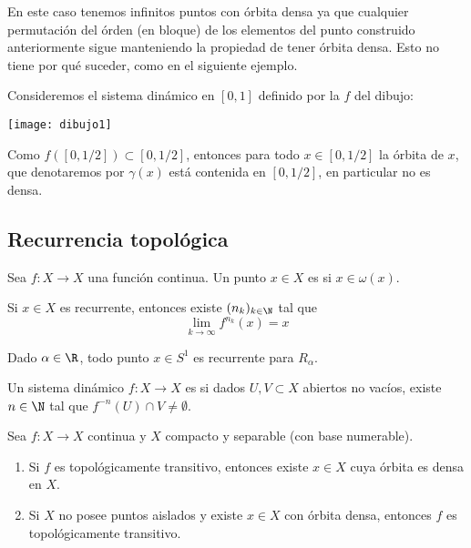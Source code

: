 \documentclass[	docname= Sistemas\ Din\'amicos,
				finished=1,
				semester=1,
				year=2017,
				professor=Godofredo\ Iommi,
				sigla=MAT2565]{apunte}
\begin{document}
En este caso tenemos infinitos puntos con órbita densa ya que cualquier permutación del órden (en bloque) de los elementos del punto construido anteriormente sigue manteniendo la propiedad de tener órbita densa. Esto no tiene por qué suceder, como en el siguiente ejemplo.

\begin{ex} Consideremos el sistema dinámico en $[0,1]$ definido por la $f$ del dibujo:
	\begin{center}
		\texttt{[image: dibujo1]}
	\end{center}
	
Como $f([0,1/2]) \subset [0,1/2]$, entonces para todo $x \in [0,1/2]$ la órbita de $x$, que denotaremos por $\gamma(x)$ está contenida en $[0,1/2]$, en particular no es densa.
\end{ex}

\subsection{Recurrencia topológica}

\begin{defn} Sea $f: X \to X$ una función continua. Un punto $x \in X$ es  si $x \in \omega(x)$.
\end{defn}

\begin{obsd} Si $x \in X$ es recurrente, entonces existe $(n_{k})_{k \in \N}$ tal que
	$$\lim_{k \to \infty} f^{n_{k}}(x) = x$$
\end{obsd}

\begin{ex} Dado $\alpha \in \R$, todo punto $x \in S^{1}$ es recurrente para $R_{\alpha}$.
\end{ex}

\begin{defn} Un sistema dinámico $f: X \to X$ es  si dados $U, V \subset X$ abiertos no vacíos, existe $n \in \N$ tal que $f^{-n}(U) \cap V \neq \emptyset$. 
\end{defn}

\begin{teo} Sea $f: X \to X$ continua y $X$ compacto y separable (con base numerable).
	\begin{enumerate}[\indent 1)]
		\item Si $f$ es topológicamente transitivo, entonces existe $x \in X$ cuya órbita es densa en $X$.
		
		\item Si $X$ no posee puntos aislados y existe $x \in X$ con órbita densa, entonces $f$ es topológicamente transitivo.
	\end{enumerate}
\end{teo}
\end{document}
